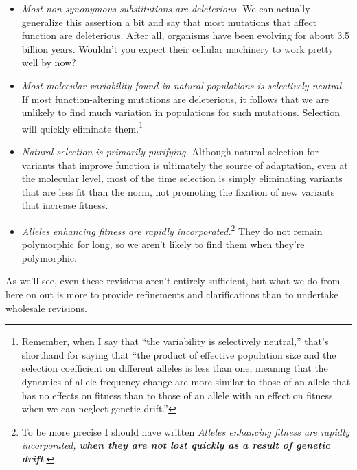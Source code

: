 \begin{itemize}

\item {\it Most non-synonymous substitutions are deleterious.\/} We
  can actually generalize this assertion a bit and say that most
  mutations that affect function are deleterious. After all, organisms
  have been evolving for about 3.5 billion years. Wouldn't you expect
  their cellular machinery to work pretty well by now?

\item {\it Most molecular variability found in natural populations is
    selectively neutral.} If most function-altering mutations are
  deleterious, it follows that we are unlikely to find much variation
  in populations for such mutations. Selection will quickly eliminate
  them.\footnote{Remember, when I say that ``the variability is
    selectively neutral,'' that's shorthand for saying that ``the
    product of effective population size and the selection coefficient
    on different alleles is less than one, meaning that the dynamics
    of allele frequency change are more similar to those of an allele
    that has no effects on fitness than to those of an allele with an
    effect on fitness when we can neglect genetic drift.''}

\item {\it Natural selection is primarily purifying.} Although natural
  selection for variants that improve function is ultimately the
  source of adaptation, even at the molecular level, most of the time
  selection is simply eliminating variants that are less fit than the
  norm, not promoting the fixation of new variants that increase
  fitness.

\item {\it Alleles enhancing fitness are rapidly
    incorporated.}\footnote{To be more precise I should have written
    {\it Alleles enhancing fitness are rapidly incorporated, {\bf when
        they are not lost quickly as a result of genetic drift}.\/}}
  They do not remain polymorphic for long, so we aren't likely to find
  them when they're polymorphic.

\end{itemize}

As we'll see, even these revisions aren't entirely sufficient, but
what we do from here on out is more to provide refinements and
clarifications than to undertake wholesale revisions.

